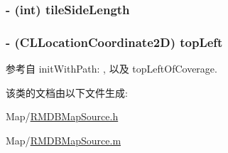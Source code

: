 \hypertarget{interface_r_m_d_b_map_source_a106cd606447ff75d7b81886d2b5a336f}{
\subsubsection[{tile\-Side\-Length}]{\setlength{\rightskip}{0pt plus 5cm}-\/ (int) tile\-Side\-Length\hspace{0.3cm}{\ttfamily [protected]}}}\label{interface_r_m_d_b_map_source_a106cd606447ff75d7b81886d2b5a336f}
\hypertarget{interface_r_m_d_b_map_source_aa8593714f212eeda83056518c4154606}{
\subsubsection[{top\-Left}]{\setlength{\rightskip}{0pt plus 5cm}-\/ (C\-L\-Location\-Coordinate2\-D) top\-Left\hspace{0.3cm}{\ttfamily [protected]}}}\label{interface_r_m_d_b_map_source_aa8593714f212eeda83056518c4154606}


参考自 init\-With\-Path\-: , 以及 top\-Left\-Of\-Coverage.



该类的文档由以下文件生成\-:\begin{DoxyCompactItemize}
\item 
Map/\hyperlink{_r_m_d_b_map_source_8h}{R\-M\-D\-B\-Map\-Source.\-h}\item 
Map/\hyperlink{_r_m_d_b_map_source_8m}{R\-M\-D\-B\-Map\-Source.\-m}\end{DoxyCompactItemize}
